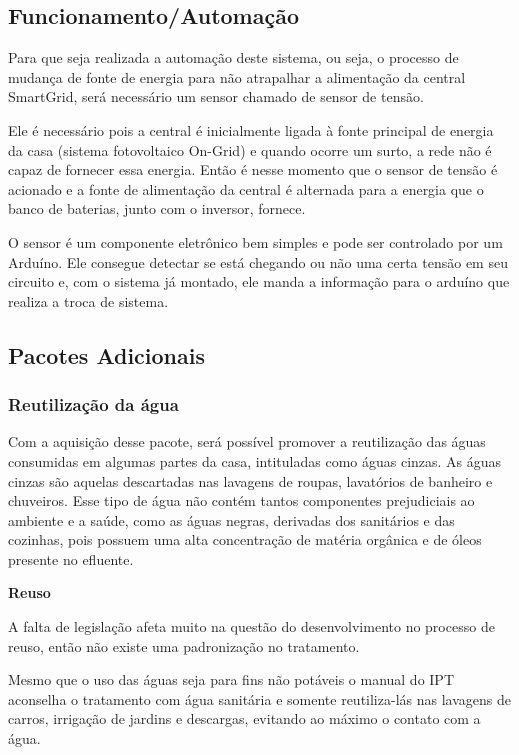 \subsection{Funcionamento/Automação}
\par Para que seja realizada a automação deste sistema, ou seja, o processo de mudança de fonte de energia para não atrapalhar a alimentação da central SmartGrid, será necessário um sensor chamado de sensor de tensão.
\par Ele é necessário pois a central é inicialmente ligada à fonte principal de energia da casa (sistema fotovoltaico On-Grid) e quando ocorre um surto, a rede não é capaz de fornecer essa energia. Então é nesse momento que o sensor de tensão é acionado e a fonte de alimentação da central é alternada para a energia que o banco de baterias, junto com o inversor, fornece.
\par O sensor é um componente eletrônico bem simples e pode ser controlado por um Arduíno. Ele consegue detectar se está chegando ou não uma certa tensão em seu circuito e, com o sistema já montado, ele manda a informação para o arduíno que realiza a troca de sistema.

\subsection{Pacotes Adicionais}

\subsubsection{Reutilização da água}
\par Com a aquisição desse pacote, será possível promover a reutilização das águas consumidas em algumas partes da casa, intituladas como águas cinzas. As águas cinzas são aquelas descartadas nas lavagens de roupas, lavatórios de banheiro e chuveiros. Esse tipo de água não contém tantos componentes prejudiciais ao ambiente e a saúde, como as águas negras, derivadas dos sanitários e das cozinhas, pois possuem uma alta concentração de matéria orgânica e de óleos presente no efluente.

\textbf{Reuso}
\par A falta de legislação afeta muito na questão do desenvolvimento no processo de reuso, então não existe uma padronização no tratamento.
\par Mesmo que o uso das águas seja para fins não potáveis o manual do IPT aconselha o tratamento com água sanitária e somente reutiliza-lás nas lavagens de carros, irrigação de jardins e descargas, evitando ao máximo o contato com a água.

